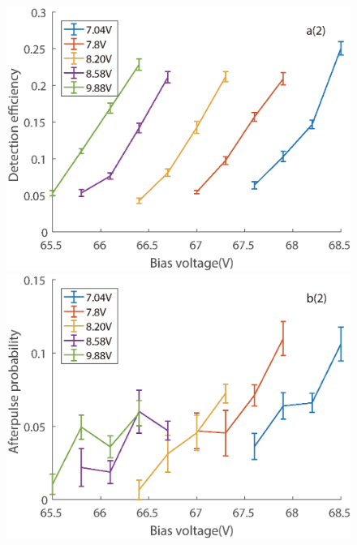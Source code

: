 \documentclass[%
 reprint,
superscriptaddress,
 amsmath,amssymb,
 aps,
]{revtex4-1}
\begin{document}
\begin{figure}
\begin{minipage}{0.24\linewidth}
\centering
\includegraphics[width = 1\textwidth]{figure/95M/efficiency.eps}%
\end{minipage}
\begin{minipage}{0.24\linewidth}
\centering
\includegraphics[width = 1\textwidth]{figure/95M/afterpulse0.eps}%
\end{minipage}
\begin{minipage}{0.24\linewidth}
\centering

\end{minipage}
\end{figure}
\end{document}
